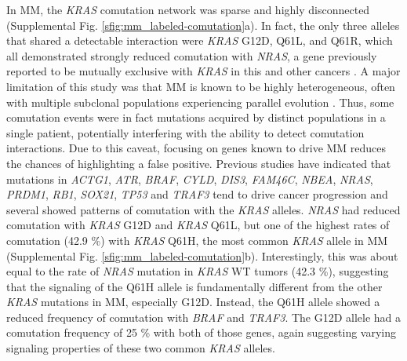 \documentclass[english, 12pt, letterpaper]{article}
\newcommand{\KRAS}{\emph{KRAS}}
\begin{document}
In MM, the \KRAS{} comutation network was sparse and highly disconnected (Supplemental Fig. \ref{sfig:mm_labeled-comutation}a).
In fact, the only three alleles that shared a detectable interaction were \KRAS{} G12D, Q61L, and Q61R, which all demonstrated strongly reduced comutation with \emph{NRAS}, a gene previously reported to be mutually exclusive with \KRAS{} in this and other cancers \cite{Lohr2014WidespreadTherapy.}.
A major limitation of this study was that MM is known to be highly heterogeneous, often with multiple subclonal populations experiencing parallel evolution \cite{Melchor2014Single-cellMyeloma., Lionetti2015MolecularActivation., Keats2012ClonalMyeloma., Corre2015GeneticsLevel, Lohr2016GeneticResolution., Lohr2014WidespreadTherapy., Xu2017MolecularActivation.}.
Thus, some comutation events were in fact mutations acquired by distinct populations in a single patient, potentially interfering with the ability to detect comutation interactions.
Due to this caveat, focusing on genes known to drive MM reduces the chances of highlighting a false positive. Previous studies have indicated that mutations in \emph{ACTG1}, \emph{ATR}, \emph{BRAF}, \emph{CYLD}, \emph{DIS3}, \emph{FAM46C}, \emph{NBEA}, \emph{NRAS}, \emph{PRDM1}, \emph{RB1}, \emph{SOX21}, \emph{TP53} and \emph{TRAF3} tend to drive cancer progression \cite{Lohr2014WidespreadTherapy., Sondka2018} and several showed patterns of comutation with the \KRAS{} alleles.
\emph{NRAS} had reduced comutation with \KRAS{} G12D and \KRAS{} Q61L, but one of the highest rates of comutation (42.9 \%) with \KRAS{} Q61H, the most common \KRAS{} allele in MM (Supplemental Fig. \ref{sfig:mm_labeled-comutation}b).
Interestingly, this was about equal to the rate of \emph{NRAS} mutation in \KRAS{} WT tumors (42.3 \%), suggesting that the signaling of the Q61H allele is fundamentally different from the other \KRAS{} mutations in MM, especially G12D.
Instead, the Q61H allele showed a reduced frequency of comutation with \emph{BRAF} and \emph{TRAF3}.
The G12D allele had a comutation frequency of 25 \% with both of those genes, again suggesting varying signaling properties of these two common \KRAS{} alleles.
\end{document}
